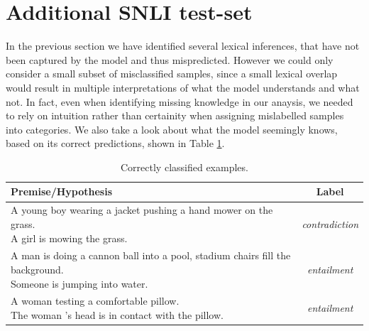 \section{Additional SNLI test-set}\label{sec:additional_snli_set}
In the previous section we have identified several lexical inferences, that have not been captured by the model and thus mispredicted.  However we could only consider a small subset of misclassified samples, since a small lexical overlap would result in multiple interpretations of what the model understands and what not. In fact, even when identifying missing knowledge in our anaysis, we needed to rely on intuition rather than certainity when assigning mislabelled samples into categories. We also take a look about what the model seemingly knows, based on its correct predictions, shown in Table \ref{table:correct_samples}.
\begin{table}[!htbp]
\begin{center}
\begin{tabular}{lc}
\textbf{Premise/Hypothesis} & \textbf{Label} \\
\toprule
\specialcell{A young boy wearing a jacket pushing a hand mower on the grass.\\A girl is mowing the grass.} & \textit{contradiction} \\
\midrule
\specialcell{A man is doing a cannon ball into a pool, stadium chairs fill the background.\\Someone is jumping into water.} & \textit{entailment} \\
\midrule
\specialcell{A woman testing a comfortable pillow.\\The woman 's head is in contact with the pillow.} & \textit{entailment} \\
\bottomrule
\end{tabular}
\caption{Correctly classified examples.}
\label{table:correct_samples}
\end{center}
\end{table}

